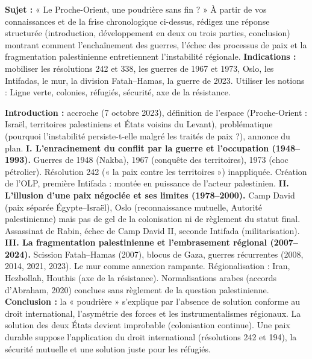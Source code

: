 \documentclass[11pt]{article}
\begin{document}
\begin{exercice}
\textbf{Sujet :} « Le Proche-Orient, une poudrière sans fin ? » À partir de vos connaissances et de la frise chronologique ci-dessus, rédigez une réponse structurée (introduction, développement en deux ou trois parties, conclusion) montrant comment l'enchaînement des guerres, l'échec des processus de paix et la fragmentation palestinienne entretiennent l'instabilité régionale.
\textbf{Indications :} mobiliser les résolutions 242 et 338, les guerres de 1967 et 1973, Oslo, les Intifadas, le mur, la division Fatah--Hamas, la guerre de 2023. Utiliser les notions : Ligne verte, colonies, réfugiés, sécurité, axe de la résistance.
\end{exercice}

\begin{corrige}
\textbf{Introduction :} accroche (7 octobre 2023), définition de l'espace (Proche-Orient : Israël, territoires palestiniens et États voisins du Levant), problématique (pourquoi l'instabilité persiste-t-elle malgré les traités de paix ?), annonce du plan.
\textbf{I. L'enracinement du conflit par la guerre et l'occupation (1948--1993).} Guerres de 1948 (Nakba), 1967 (conquête des territoires), 1973 (choc pétrolier). Résolution 242 (« la paix contre les territoires ») inappliquée. Création de l'OLP, première Intifada : montée en puissance de l'acteur palestinien.
\textbf{II. L'illusion d'une paix négociée et ses limites (1978--2000).} Camp David (paix séparée Égypte--Israël), Oslo (reconnaissance mutuelle, Autorité palestinienne) mais pas de gel de la colonisation ni de règlement du statut final. Assassinat de Rabin, échec de Camp David II, seconde Intifada (militarisation).
\textbf{III. La fragmentation palestinienne et l'embrasement régional (2007--2024).} Scission Fatah--Hamas (2007), blocus de Gaza, guerres récurrentes (2008, 2014, 2021, 2023). Le mur comme annexion rampante. Régionalisation : Iran, Hezbollah, Houthis (axe de la résistance). Normalisations arabes (accords d'Abraham, 2020) conclues sans règlement de la question palestinienne.
\textbf{Conclusion :} la « poudrière » s'explique par l'absence de solution conforme au droit international, l'asymétrie des forces et les instrumentalismes régionaux. La solution des deux États devient improbable (colonisation continue). Une paix durable suppose l'application du droit international (résolutions 242 et 194), la sécurité mutuelle et une solution juste pour les réfugiés.
\end{corrige}
\end{document}
